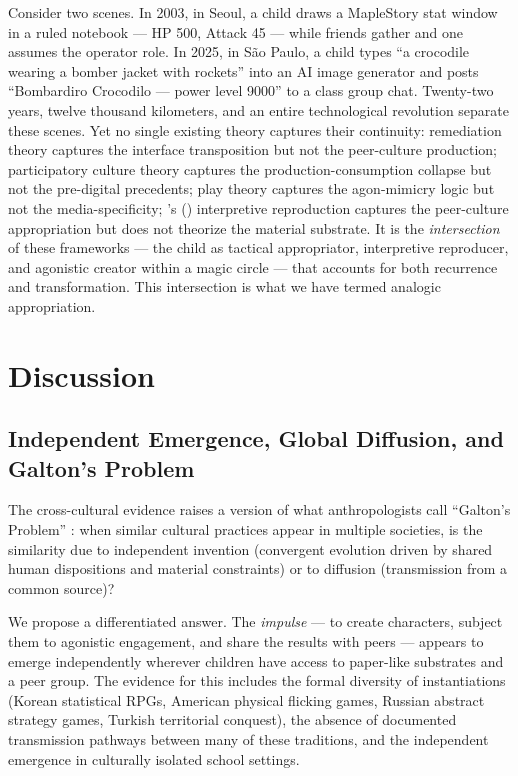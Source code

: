 \documentclass[12pt]{article}
\begin{document}
Consider two scenes. In 2003, in Seoul, a child draws a MapleStory stat window in a ruled notebook --- HP 500, Attack 45 --- while friends gather and one assumes the operator role. In 2025, in S\~{a}o Paulo, a child types ``a crocodile wearing a bomber jacket with rockets'' into an AI image generator and posts ``Bombardiro Crocodilo --- power level 9000'' to a class group chat. Twenty-two years, twelve thousand kilometers, and an entire technological revolution separate these scenes. Yet no single existing theory captures their continuity: remediation theory \citep{bolter1999} captures the interface transposition but not the peer-culture production; participatory culture theory \citep{jenkins2006} captures the production-consumption collapse but not the pre-digital precedents; play theory \citep{caillois1961,huizinga1938} captures the agon-mimicry logic but not the media-specificity; \citeauthor{corsaro2005}'s (\citeyear{corsaro2005}) interpretive reproduction captures the peer-culture appropriation but does not theorize the material substrate. It is the \emph{intersection} of these frameworks --- the child as tactical appropriator, interpretive reproducer, and agonistic creator within a magic circle --- that accounts for both recurrence and transformation. This intersection is what we have termed analogic appropriation.

\section{Discussion}

\subsection{Independent Emergence, Global Diffusion, and Galton's Problem}

The cross-cultural evidence raises a version of what anthropologists call ``Galton's Problem'' \citep{naroll1961}: when similar cultural practices appear in multiple societies, is the similarity due to independent invention (convergent evolution driven by shared human dispositions and material constraints) or to diffusion (transmission from a common source)?

We propose a differentiated answer. The \emph{impulse} --- to create characters, subject them to agonistic engagement, and share the results with peers --- appears to emerge independently wherever children have access to paper-like substrates and a peer group. The evidence for this includes the formal diversity of instantiations (Korean statistical RPGs, American physical flicking games, Russian abstract strategy games, Turkish territorial conquest), the absence of documented transmission pathways between many of these traditions, and the independent emergence in culturally isolated school settings.
\end{document}
